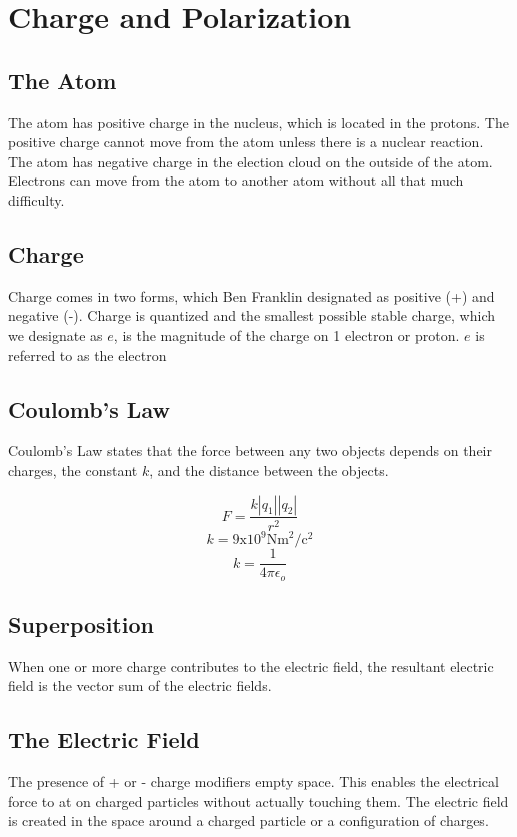 \section{Charge and Polarization}

\subsection{The Atom}
The atom has positive charge in the nucleus, which is located in the protons. The positive charge cannot move from the atom unless there is a nuclear reaction. \\

The atom has negative charge in the election cloud on the outside of the atom. Electrons can move from the atom to another atom without all that much difficulty.


\subsection{Charge}
Charge comes in two forms, which Ben Franklin designated as positive (+) and negative (-). Charge is quantized and the smallest possible stable charge, which we designate as $e$, is the magnitude of the charge on 1 electron or proton. $e$ is referred to as the electron

\subsection{Coulomb's Law}
Coulomb's Law states that the force between any two objects depends on their charges, the constant $k$, and the distance between the objects. 

\[F=\frac{k|q_1| |q_2|}{r^2}\]
\[k=9\text{x}10^9 \text{Nm}^2/\text{c}^2\]
\[k=\frac{1}{4\pi\epsilon _o}\]

\subsection{Superposition}
When one or more charge contributes to the electric field, the resultant electric field is the vector sum of the electric fields. 


\subsection{The Electric Field}
The presence of + or - charge modifiers empty space. This enables the electrical force to at on charged particles without actually touching them. The electric field is created in the space around a charged particle or a configuration of charges.\\

